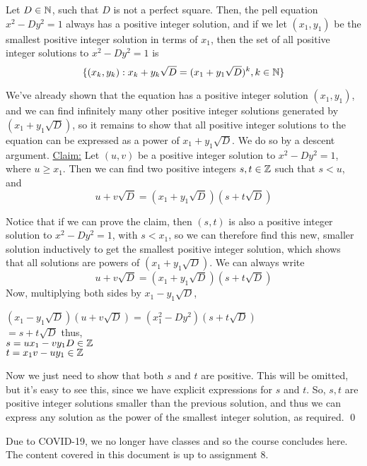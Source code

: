 \documentclass[../main.tex]{subfiles}
\begin{document}
\begin{thm}
    Let $D \in \mathbb{N}$, such that $D$ is not a perfect square. Then, the pell equation $x^2-Dy^2=1$ always has a positive integer solution, and if we let $(x_1,y_1)$ be the smallest positive integer solution in terms of $x_1$, then the set of all positive integer solutions to $x^2-Dy^2=1$ is $$\{(x_k,y_k):x_k+y_k\sqrt{D}=(x_1+y_1\sqrt{D})^k, k \in \mathbb{N}\}$$
\end{thm}
\begin{pf}
    We've already shown that the equation has a positive integer solution $(x_1,y_1)$, and we can find infinitely many other positive integer solutions generated by $(x_1+y_1\sqrt{D})$, so it remains to show that all positive integer solutions to the equation can be expressed as a power of $x_1+y_1\sqrt{D}$. We do so by a descent argument. \sspace
    \underline{Claim:} Let $(u,v)$ be a positive integer solution to $x^2-Dy^2=1$, where $u \geq x_1$. Then we can find two positive integers $s,t \in \mathbb{Z}$ such that $s < u$, and $$u+v\sqrt{D}=(x_1+y_1\sqrt{D})(s+t\sqrt{D})$$
\end{pf}
\begin{pf}[cont.]
    Notice that if we can prove the claim, then $(s,t)$ is also a positive integer solution to $x^2-Dy^2=1$, with $s < x_1$, so we can therefore find this new, smaller solution inductively to get the smallest positive integer solution, which shows that all solutions are powers of $(x_1+y_1\sqrt{D})$. \sspace
    We can always write $$u+v\sqrt{D}=(x_1+y_1\sqrt{D})(s+t\sqrt{D})$$ Now, multiplying both sides by $x_1-y_1\sqrt{D}$, 
    \begin{center}
        $(x_1-y_1\sqrt{D})(u+v\sqrt{D})=(x_1^2-Dy^2)(s+t\sqrt{D})$ \\
        $=s+t\sqrt{D}$ thus, \\
        $s=ux_1-vy_1D \in \mathbb{Z}$ \\
        $t=x_1v-uy_1 \in \mathbb{Z}$ 
    \end{center}
    Now we just need to show that both $s$ and $t$ are positive. This will be omitted, but it's easy to see this, since we have explicit expressions for $s$ and $t$. So, $s,t$ are positive integer solutions smaller than the previous solution, and thus we can express any solution as the power of the smallest integer solution, as required. \qed
\end{pf}
Due to COVID-19, we no longer have classes and so the course concludes here. The content covered in this document is up to assignment 8.
\end{document}
